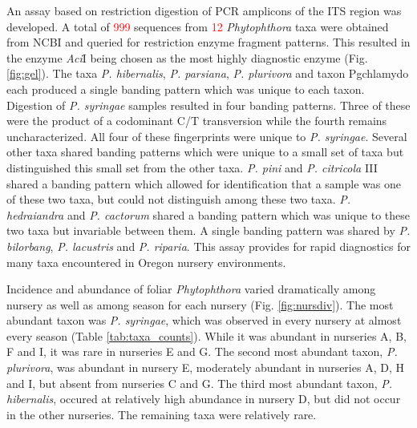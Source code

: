 \documentclass[12pt]{article}
\begin{document}
An assay based on restriction digestion of PCR amplicons of the ITS region was developed.  A total of \textcolor{red}{999}  sequences from \textcolor{red}{12} \emph{Phytophthora} taxa were obtained from NCBI and queried for restriction enzyme fragment patterns.  This resulted in the enzyme \emph{Aci}I being chosen as the most highly diagnostic enzyme (Fig. \ref{fig:gel}).  The taxa \emph{P. hibernalis}, \emph{P. parsiana}, \emph{P. plurivora} and taxon Pgchlamydo each produced a single banding pattern which was unique to each taxon.  Digestion of \emph{P. syringae} samples resulted in four banding patterns.  Three of these were the product of a codominant C/T transversion while the fourth remains uncharacterized.  All four of these fingerprints were unique to \emph{P. syringae}.  Several other taxa shared banding patterns which were unique to a small set of taxa but distinguished this small set from the other taxa.  \emph{P. pini} and \emph{P. citricola} III shared a banding pattern which allowed for identification that a sample was one of these two taxa, but could not distinguish among these two taxa.  \emph{P. hedraiandra} and \emph{P. cactorum} shared a banding pattern which was unique to these two taxa but invariable between them.  A single banding pattern was shared by \emph{P. bilorbang}, \emph{P. lacustris} and \emph{P. riparia}.  This assay provides for rapid diagnostics for many taxa encountered in Oregon nursery environments.





Incidence and abundance of foliar \emph{Phytophthora} varied dramatically among nursery as well as among season for each nursery (Fig. \ref{fig:nursdiv}).  The most abundant taxon was \emph{P. syringae}, which was observed in every nursery at almost every season (Table \ref{tab:taxa_counts}).  While it was abundant in nurseries A, B, F and I, it was rare in nurseries E and G.  The second most abundant taxon, \emph{P. plurivora}, was abundant in nursery E, moderately abundant in nurseries A, D, H and I, but absent from nurseries C and G.  The third most abundant taxon, \emph{P. hibernalis}, occured at relatively high abundance in nursery D, but did not occur in the other nurseries.  The remaining taxa were relatively rare.
\end{document}
